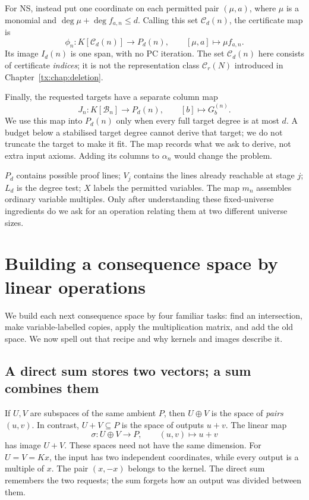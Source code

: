 For NS, instead put one coordinate on each permitted pair $(\mu,a)$,
where $\mu$ is a monomial and
$\deg\mu+\deg f_{a,n}\le d$. Calling this set $\mathcal C_d(n)$,
the certificate map is
\[
 \phi_n:K[\mathcal C_d(n)]\to P_d(n),\qquad[\mu,a]\mapsto\mu f_{a,n}.
\]
Its image $I_d(n)$ is one span, with no PC iteration.
The set $\mathcal C_d(n)$ here consists of certificate \emph{indices};
it is not the representation class $\mathcal C_r(N)$ introduced
in Chapter~\ref{tx:chap:deletion}.

Finally, the requested targets have a separate column map
\[
       J_n:K[\mathcal B_n]\to P_d(n),\qquad[b]\mapsto G_b^{(n)}.
\]
We use this map into $P_d(n)$ only when every full target degree
is at most $d$. A budget below a stabilised target degree cannot
derive that target; we do not truncate the target to make it fit.
The map records what we ask to derive, not extra input axioms.
Adding its columns to $\alpha_n$ would change the problem.

\begin{checkpoint}
$P_d$ contains possible proof lines; $V_j$ contains the lines already
reachable at stage $j$; $L_d$ is the degree test; $X$ labels the permitted
variables. The map $m_n$ assembles ordinary variable multiples.
Only after understanding these fixed-universe ingredients do we ask for
an operation relating them at two different universe sizes.
\end{checkpoint}

\section{Building a consequence space by linear operations}\label{tx:sec:grammar}
We build each next consequence space by four familiar tasks:
find an intersection, make variable-labelled copies, apply the
multiplication matrix, and add the old space. We now spell out that
recipe and why kernels and images describe it.

\subsection{A direct sum stores two vectors; a sum combines them}
If $U,V$ are subspaces of the same ambient $P$, then $U\oplus V$
is the space of \emph{pairs} $(u,v)$. In contrast, $U+V\subseteq P$
is the space of outputs $u+v$. The linear map
\[
              \sigma:U\oplus V\to P,\qquad (u,v)\mapsto u+v
\]
has image $U+V$.
These spaces need not have the same dimension.
For $U=V=Kx$, the input has two independent coordinates,
while every output is a multiple of $x$. The pair $(x,-x)$
belongs to the kernel. The direct sum remembers the two requests;
the sum forgets how an output was divided between them.

